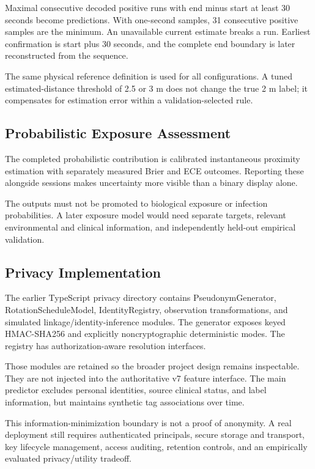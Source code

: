 \documentclass[12pt,a4paper]{report}
\begin{document}
Maximal consecutive decoded positive runs with end minus start at least 30 seconds become predictions. With one-second samples, 31 consecutive positive samples are the minimum. An unavailable current estimate breaks a run. Earliest confirmation is start plus 30 seconds, and the complete end boundary is later reconstructed from the sequence.

The same physical reference definition is used for all configurations. A tuned estimated-distance threshold of 2.5 or 3 m does not change the true 2 m label; it compensates for estimation error within a validation-selected rule.

\subsection{Probabilistic Exposure Assessment}
The completed probabilistic contribution is calibrated instantaneous proximity estimation with separately measured Brier and ECE outcomes. Reporting these alongside sessions makes uncertainty more visible than a binary display alone.

The outputs must not be promoted to biological exposure or infection probabilities. A later exposure model would need separate targets, relevant environmental and clinical information, and independently held-out empirical validation.

\subsection{Privacy Implementation}
The earlier TypeScript privacy directory contains PseudonymGenerator, RotationScheduleModel, IdentityRegistry, observation transformations, and simulated linkage/identity-inference modules. The generator exposes keyed HMAC-SHA256 and explicitly noncryptographic deterministic modes. The registry has authorization-aware resolution interfaces.

Those modules are retained so the broader project design remains inspectable. They are not injected into the authoritative v7 feature interface. The main predictor excludes personal identities, source clinical status, and label information, but maintains synthetic tag associations over time.

This information-minimization boundary is not a proof of anonymity. A real deployment still requires authenticated principals, secure storage and transport, key lifecycle management, access auditing, retention controls, and an empirically evaluated privacy/utility tradeoff.
\end{document}
